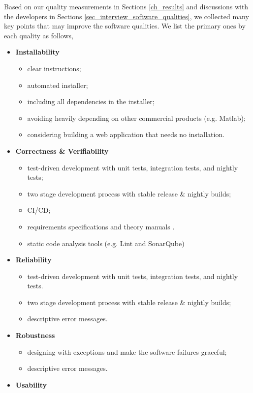 Based on our quality measurements in Sections \ref{ch_results} and discussions with the developers in Sections \ref{sec_interview_software_qualities}, we collected many key points that may improve the software qualities. We list the primary ones by each quality as follows,
\begin{itemize}
\item \textbf{Installability}
\begin{itemize}
    \item clear instructions;
    \item automated installer;
    \item including all dependencies in the installer;
    \item avoiding heavily depending on other commercial products (e.g. Matlab);
    \item considering building a web application that needs no installation.
\end{itemize}
\item \textbf{Correctness \& Verifiability}
\begin{itemize}
    \item test-driven development with unit tests, integration tests, and nightly tests;
    \item two stage development process with stable release \& nightly builds;
    \item CI/CD;
    \item requirements specifications and theory manuals \cite{Smith2016} \cite{SmithAndLai2005}.
    \item static code analysis tools (e.g. Lint and SonarQube)
\end{itemize}
\item \textbf{Reliability}
\begin{itemize}
    \item test-driven development with unit tests, integration tests, and nightly tests.
    \item two stage development process with stable release \& nightly builds;
    \item descriptive error messages.
\end{itemize}
\item \textbf{Robustness}
\begin{itemize}
    \item designing with exceptions and make the software failures graceful;
    \item descriptive error messages.
\end{itemize}
\item \textbf{Usability}

\end{itemize}
